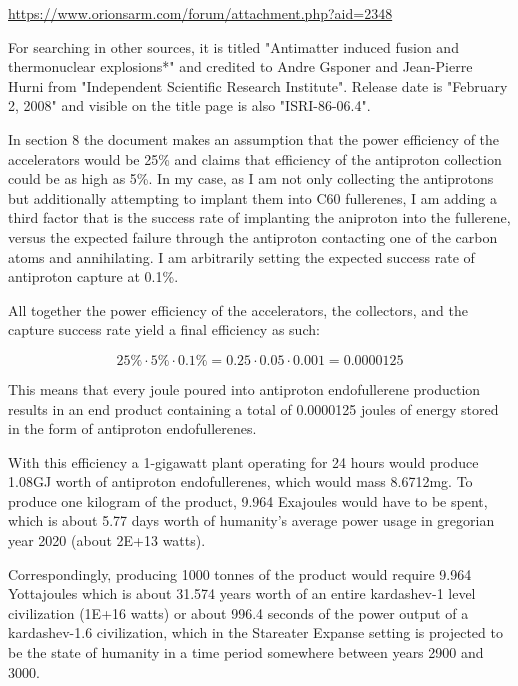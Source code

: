\documentclass[a4paper]{article}
\begin{document}
    \href{https://www.orionsarm.com/forum/attachment.php?aid=2348}{https://www.orionsarm.com/forum/attachment.php?aid=2348}
    
    For searching in other sources, it is titled "Antimatter induced fusion and thermonuclear explosions*" and credited to Andre Gsponer and Jean-Pierre Hurni from "Independent Scientific Research Institute".
    Release date is "February 2, 2008" and visible on the title page is also "ISRI-86-06.4".
    
    \medskip
    
    In section 8 the document makes an assumption that the power efficiency of the accelerators would be 25\% and claims that efficiency of the antiproton collection could be as high as 5\%.
    In my case, as I am not only collecting the antiprotons but additionally attempting to implant them into C60 fullerenes, I am adding a third factor that is the success rate of implanting the aniproton into the fullerene, versus the expected failure through the antiproton contacting one of the carbon atoms and annihilating.
    I am arbitrarily setting the expected success rate of antiproton capture at 0.1\%.
    
    \medskip
    
    All together the power efficiency of the accelerators, the collectors, and the capture success rate yield a final efficiency as such:
    
    $$ 25\% \cdot 5\% \cdot 0.1\% = 0.25 \cdot 0.05 \cdot 0.001 = 0.0000125 $$
    
    This means that every joule poured into antiproton endofullerene production results in an end product containing a total of 0.0000125 joules of energy stored in the form of antiproton endofullerenes.
    
    \medskip
    
    With this efficiency a 1-gigawatt plant operating for 24 hours would produce 1.08GJ worth of antiproton endofullerenes, which would mass 8.6712mg.
    To produce one kilogram of the product, 9.964 Exajoules would have to be spent, which is about 5.77 days worth of humanity's average power usage in gregorian year 2020 (about 2E+13 watts).
    
    \medskip
    
    Correspondingly, producing 1000 tonnes of the product would require 9.964 Yottajoules which is about 31.574 years worth of an entire kardashev-1 level civilization (1E+16 watts) or about 996.4 seconds of the power output of a kardashev-1.6 civilization, which in the Stareater Expanse setting is projected to be the state of humanity in a time period somewhere between years 2900 and 3000.
    
\end{document}
